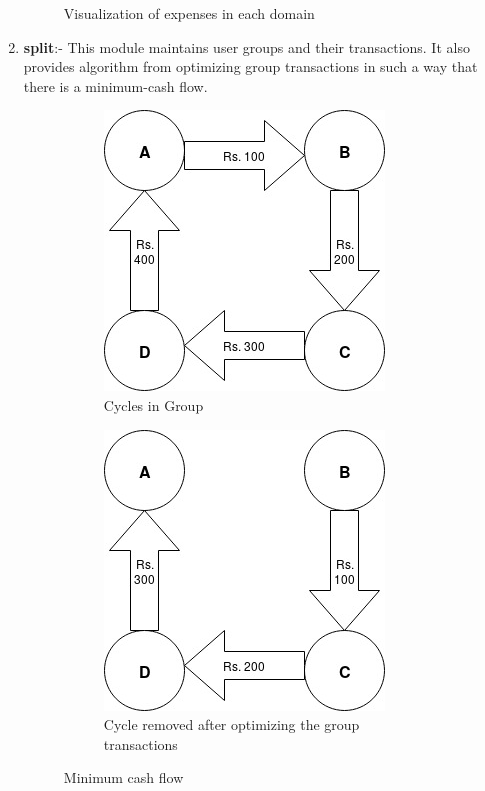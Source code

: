 \documentclass[12pt]{article}
\begin{document}
\begin{enumerate}
\begin{figure}[tb]
    \caption{Visualization of expenses in each domain}
    \end{figure}
    \item \textbf{split}:- This module maintains user groups and their transactions. It also provides algorithm from optimizing group transactions in such a way that there is a minimum-cash flow.
    \begin{figure}[!hb]
        \begin{subfigure}[t]{0.5\hsize}
            \includegraphics[width=0.9\linewidth]{Cycle.jpg}
            \caption{Cycles in Group}
        \end{subfigure}   
        \begin{subfigure}[t]{0.5\hsize}
            \includegraphics[width=0.9\linewidth]{Cycle_break.jpg}
            \caption{Cycle removed after optimizing the group transactions}
        \end{subfigure}
            \caption{Minimum cash flow}
    \end{figure}


\end{enumerate}
\end{document}
